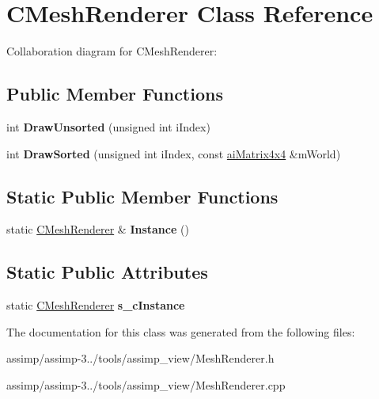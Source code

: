 \hypertarget{class_c_mesh_renderer}{\section{C\+Mesh\+Renderer Class Reference}
\label{class_c_mesh_renderer}
}


Collaboration diagram for C\+Mesh\+Renderer\+:
\subsection*{Public Member Functions}
\begin{DoxyCompactItemize}
\item 
\hypertarget{class_c_mesh_renderer_a5525467abc9b2df68ccfcdeff2ddf3aa}{int {\bfseries Draw\+Unsorted} (unsigned int i\+Index)}\label{class_c_mesh_renderer_a5525467abc9b2df68ccfcdeff2ddf3aa}

\item 
\hypertarget{class_c_mesh_renderer_a329e88e7685be2ac1bc027122ab284fa}{int {\bfseries Draw\+Sorted} (unsigned int i\+Index, const \hyperlink{structai_matrix4x4}{ai\+Matrix4x4} \&m\+World)}\label{class_c_mesh_renderer_a329e88e7685be2ac1bc027122ab284fa}

\end{DoxyCompactItemize}
\subsection*{Static Public Member Functions}
\begin{DoxyCompactItemize}
\item 
\hypertarget{class_c_mesh_renderer_a6be907e2dd16643879f68acd357e5163}{static \hyperlink{class_c_mesh_renderer}{C\+Mesh\+Renderer} \& {\bfseries Instance} ()}\label{class_c_mesh_renderer_a6be907e2dd16643879f68acd357e5163}

\end{DoxyCompactItemize}
\subsection*{Static Public Attributes}
\begin{DoxyCompactItemize}
\item 
\hypertarget{class_c_mesh_renderer_a50805113eebf723076804cc8185b601f}{static \hyperlink{class_c_mesh_renderer}{C\+Mesh\+Renderer} {\bfseries s\+\_\+c\+Instance}}\label{class_c_mesh_renderer_a50805113eebf723076804cc8185b601f}

\end{DoxyCompactItemize}


The documentation for this class was generated from the following files\+:\begin{DoxyCompactItemize}
\item 
assimp/assimp-\/3../tools/assimp\+\_\+view/Mesh\+Renderer.\+h\item 
assimp/assimp-\/3../tools/assimp\+\_\+view/Mesh\+Renderer.\+cpp\end{DoxyCompactItemize}
